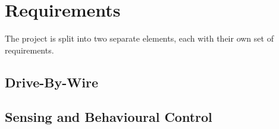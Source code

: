 \chapter{Requirements}
The project is split into two separate elements, each with their own set of requirements.
\section{Drive-By-Wire}

\section{Sensing and Behavioural Control}